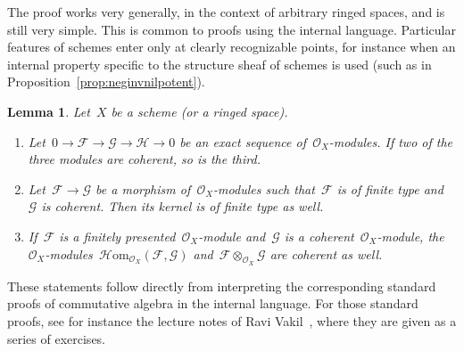 \documentclass[10pt,reqno,a4paper]{amsbook}
\makeatletter
\theoremstyle{definition}
\theoremstyle{plain}
\newtheorem{lemma}[defn]{Lemma}
\theoremstyle{remark}
\newcommand{\F}{\mathcal{F}}
\newcommand{\G}{\mathcal{G}}
\renewcommand{\H}{\mathcal{H}}
\renewcommand{\O}{\mathcal{O}}
\newcommand{\HOM}{\mathcal{H}\mathrm{om}}
\newcommand{\?}{\,{:}\,}
\renewcommand{\_}{\mathpunct{.}\,}
\renewenvironment{proof}[1][\proofname]{\par
  \pushQED{\qed}%
  \normalfont \topsep6\p@\@plus6\p@\relax
  \trivlist
  \item[\hskip\labelsep
        \itshape
    #1\@addpunct{.}]\ignorespaces
}{%
  \popQED\endtrivlist\@endpefalse
}
\makeatother
\begin{document}
The proof works very generally, in the context of arbitrary ringed
spaces, and is still very simple. This is common to proofs using the internal
language. Particular features of schemes enter only at clearly recognizable
points, for instance when an internal property specific to the structure sheaf
of schemes is used (such as in Proposition~\ref{prop:neginvnilpotent}).

\begin{lemma}\label{lemma:coherent-stuff}
Let~$X$ be a scheme (or a ringed space).
\begin{enumerate}
\item Let~$0 \to \F \to \G \to \H \to 0$ be an exact sequence
of~$\O_X$-modules. If two of the three modules are coherent, so is the third.
\item Let~$\F \to \G$ be a morphism of~$\O_X$-modules such that~$\F$ is
of finite type and~$\G$ is coherent. Then its kernel is of finite type as well.
\item If~$\F$ is a finitely presented~$\O_X$-module and~$\G$ is a
coherent~$\O_X$-module, the~$\O_X$-modules~$\HOM_{\O_X}(\F,\G)$ and~$\F \otimes_{\O_X} \G$
are coherent as well.
\end{enumerate}
\end{lemma}
\begin{proof}These statements follow directly from interpreting the
corresponding standard proofs of commutative algebra in the internal language.
For those standard proofs, see for instance the lecture notes of Ravi
Vakil~\cite[Section~13.8]{vakil:foag}, where they are given as a series of
exercises.
\end{proof}
\end{document}
